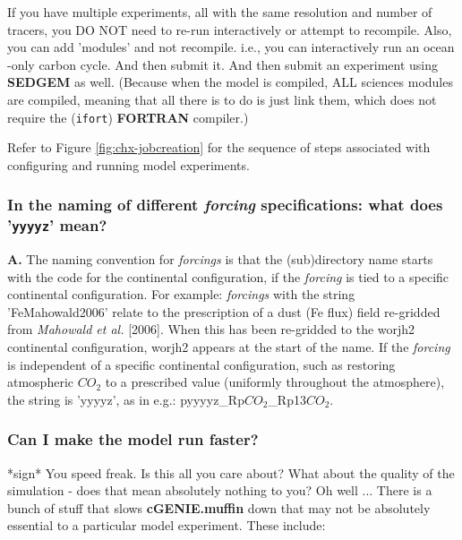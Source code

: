 \documentclass[11pt,fleqn]{book} %
\begin{document}
If you have multiple experiments, all with the same resolution and number of tracers, you DO NOT need to re-run interactively or attempt to recompile. Also, you can add 'modules' and not recompile. i.e., you can interactively run an ocean -only carbon cycle. And then submit it. And then submit an experiment using \textbf{SEDGEM} as well. (Because when the model is compiled, ALL sciences modules are compiled, meaning that all there is to do is just link them, which does not require the (\texttt{ifort}) \textbf{FORTRAN} compiler.)

Refer to Figure \ref{fig:chx-jobcreation} for the sequence of steps associated with configuring and running model experiments.

%
\subsubsection{In the naming of different \textit{forcing} specifications: what does '\texttt{yyyyz}' mean?}

\textbf{A.} The naming convention for \textit{forcings} is that the (sub)directory name starts with the code for the continental configuration, if the \textit{forcing} is tied to a specific continental configuration. For example: \textit{forcings} with the string '\textsf{\footnotesize FeMahowald2006}' relate to the prescription of a dust (Fe flux) field re-gridded from \textit{Mahowald et al.} [2006]. When this has been re-gridded to the \textsf{\footnotesize worjh2} continental configuration, \textsf{\footnotesize worjh2} appears at the start of the name. If the \textit{forcing} is independent of a specific continental configuration, such as restoring atmospheric \(CO_{2}\) to a prescribed value (uniformly throughout the atmosphere), the string is '\textsf{\footnotesize yyyyz}', as in e.g.: \textsf{\footnotesize pyyyyz\_Rp\(CO_{2}\)\_Rp13\(CO_{2}\)}.

%
\subsubsection{Can I make the model run faster?}

*sign* You speed freak. Is this all you care about? What about the quality of the simulation - does that mean absolutely nothing to you? Oh well ...
There is a bunch of stuff that slows \textbf{cGENIE.muffin} down that may not be absolutely essential to a particular model experiment. These include:
\end{document}
